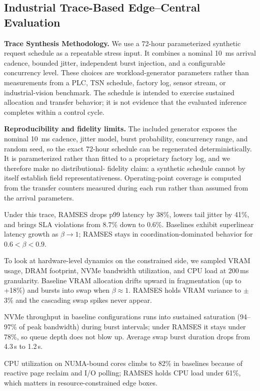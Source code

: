 \subsection{Industrial Trace-Based Edge--Central Evaluation}
\label{edge-central-eval}

\textbf{Trace Synthesis Methodology.}
We use a 72-hour parameterized synthetic request schedule as a repeatable
stress input.  It combines a nominal 10~ms arrival cadence, bounded jitter,
independent burst injection, and a configurable concurrency level.  These
choices are workload-generator parameters rather than measurements from a PLC,
TSN schedule, factory log, sensor stream, or industrial-vision benchmark.  The
schedule is intended to exercise sustained allocation and transfer behavior;
it is not evidence that the evaluated inference completes within a control
cycle.

\textbf{Reproducibility and fidelity limits.}
The included generator exposes the nominal 10~ms cadence, jitter model,
burst probability, concurrency range, and random seed, so the exact 72-hour
schedule can be regenerated deterministically.  It is parameterized rather than
fitted to a proprietary factory log, and we therefore make no distributional-
fidelity claim: a synthetic schedule cannot by itself establish field
representativeness.  Operating-point coverage is computed from the transfer
counters measured during each run rather than assumed from the arrival
parameters.

Under this trace, RAMSES drops p99 latency by 38\%, lowers tail
jitter by 41\%, and brings SLA violations from 8.7\% down to 0.6\%.
Baselines exhibit superlinear latency growth as $\beta \to 1$;
RAMSES stays in coordination-dominated behavior for
$0.6 < \beta < 0.9$.

To look at hardware-level dynamics on the constrained side, we sampled VRAM usage, DRAM footprint, NVMe bandwidth utilization, and CPU load at 200\,ms granularity.
Baseline VRAM allocation drifts upward in fragmentation (up to +18\%) and bursts into swap when $\beta \approx 1$.
RAMSES holds VRAM variance to $\pm$3\% and the cascading swap spikes never appear.

NVMe throughput in baseline configurations runs into sustained saturation (94--97\% of peak bandwidth) during burst intervals; under RAMSES it stays under 78\%, so queue depth does not blow up.
Average swap burst duration drops from 4.3\,s to 1.2\,s.

CPU utilization on NUMA-bound cores climbs to 82\% in baselines because of reactive page reclaim and I/O polling; RAMSES holds CPU load under 61\%, which matters in resource-constrained edge boxes.

